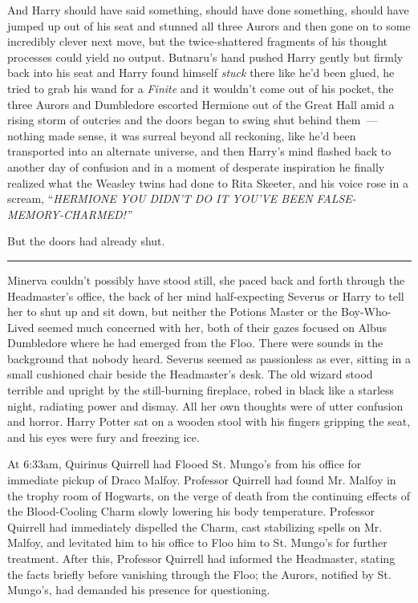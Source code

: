 And Harry should have said something, should have done something, should have jumped up out of his seat and stunned all three Aurors and then gone on to some incredibly clever next move, but the twice-shattered fragments of his thought processes could yield no output. Butnaru's hand pushed Harry gently but firmly back into his seat and Harry found himself \emph{stuck} there like he'd been glued, he tried to grab his wand for a \emph{Finite} and it wouldn't come out of his pocket, the three Aurors and Dumbledore escorted Hermione out of the Great Hall amid a rising storm of outcries and the doors began to swing shut behind them~--- nothing made sense, it was surreal beyond all reckoning, like he'd been transported into an alternate universe, and then Harry's mind flashed back to another day of confusion and in a moment of desperate inspiration he finally realized what the Weasley twins had done to Rita Skeeter, and his voice rose in a scream, ``\emph{HERMIONE YOU DIDN'T DO IT YOU'VE BEEN FALSE-MEMORY-CHARMED!''}

But the doors had already shut.

\begin{center}\rule{3in}{0.4pt}\end{center}

Minerva couldn't possibly have stood still, she paced back and forth through the Headmaster's office, the back of her mind half-expecting Severus or Harry to tell her to shut up and sit down, but neither the Potions Master or the Boy-Who-Lived seemed much concerned with her, both of their gazes focused on Albus Dumbledore where he had emerged from the Floo. There were sounds in the background that nobody heard. Severus seemed as passionless as ever, sitting in a small cushioned chair beside the Headmaster's desk. The old wizard stood terrible and upright by the still-burning fireplace, robed in black like a starless night, radiating power and dismay. All her own thoughts were of utter confusion and horror. Harry Potter sat on a wooden stool with his fingers gripping the seat, and his eyes were fury and freezing ice.

At 6:33am, Quirinus Quirrell had Flooed St. Mungo's from his office for immediate pickup of Draco Malfoy. Professor Quirrell had found Mr. Malfoy in the trophy room of Hogwarts, on the verge of death from the continuing effects of the Blood-Cooling Charm slowly lowering his body temperature. Professor Quirrell had immediately dispelled the Charm, cast stabilizing spells on Mr. Malfoy, and levitated him to his office to Floo him to St. Mungo's for further treatment. After this, Professor Quirrell had informed the Headmaster, stating the facts briefly before vanishing through the Floo; the Aurors, notified by St. Mungo's, had demanded his presence for questioning.

